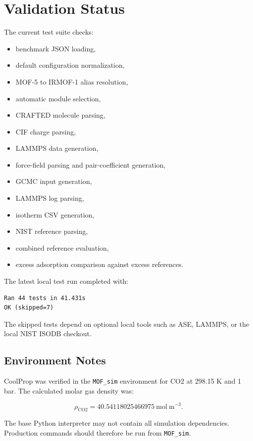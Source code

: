 \section{Validation Status}

The current test suite checks:

\begin{itemize}
    \item benchmark JSON loading,
    \item default configuration normalization,
    \item MOF-5 to IRMOF-1 alias resolution,
    \item automatic module selection,
    \item CRAFTED molecule parsing,
    \item CIF charge parsing,
    \item LAMMPS data generation,
    \item force-field parsing and pair-coefficient generation,
    \item GCMC input generation,
    \item LAMMPS log parsing,
    \item isotherm CSV generation,
    \item NIST reference parsing,
    \item combined reference evaluation,
    \item excess adsorption comparison against excess references.
\end{itemize}

The latest local test run completed with:

\begin{lstlisting}
Ran 44 tests in 41.431s
OK (skipped=7)
\end{lstlisting}

The skipped tests depend on optional local tools such as ASE, LAMMPS, or the local NIST ISODB checkout.

\subsection{Environment Notes}

CoolProp was verified in the \texttt{MOF\_sim} environment for CO2 at 298.15 K and 1 bar.
The calculated molar gas density was:

\begin{equation}
    \rho_{\mathrm{CO2}} = 40.54118025466975~\mathrm{mol~m^{-3}}.
\end{equation}

The base Python interpreter may not contain all simulation dependencies.
Production commands should therefore be run from \texttt{MOF\_sim}.
